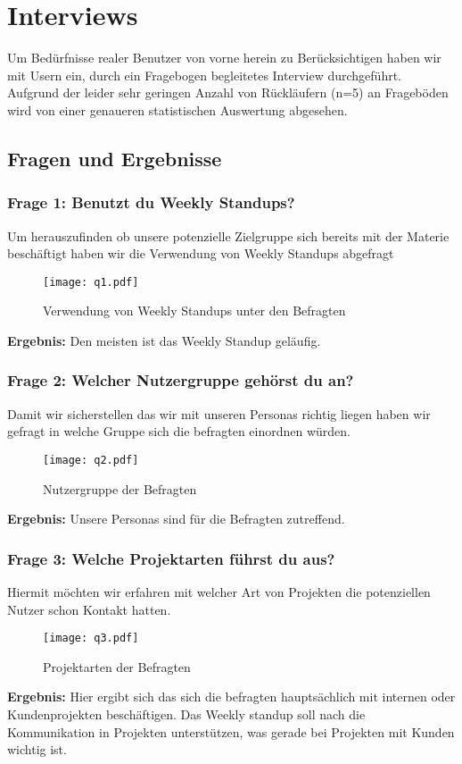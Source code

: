 \chapter{Interviews}

Um Bedürfnisse realer Benutzer von vorne herein zu Berücksichtigen haben wir mit Usern ein, durch ein Fragebogen begleitetes Interview durchgeführt. Aufgrund der leider sehr geringen Anzahl von Rückläufern (n=5) an Frageböden wird von einer genaueren statistischen Auswertung abgesehen.

\section{Fragen und Ergebnisse}

\subsection{Frage 1: Benutzt du Weekly Standups?}
Um herauszufinden ob unsere potenzielle Zielgruppe sich bereits mit der Materie beschäftigt haben wir die Verwendung von Weekly Standups abgefragt
\begin{figure}[H]
	\centering
	\texttt{[image: q1.pdf]}
    \caption{Verwendung von Weekly Standups unter den Befragten}
	\label{fig:q1}
\end{figure}
\textbf{Ergebnis:} Den meisten ist das Weekly Standup geläufig.
\subsection{Frage 2: Welcher Nutzergruppe gehörst du an?}
Damit wir sicherstellen das wir mit unseren Personas richtig liegen haben wir gefragt in welche Gruppe sich die befragten einordnen würden.
\begin{figure}[H]
	\centering
	\texttt{[image: q2.pdf]}
    \caption{Nutzergruppe der Befragten}
	\label{fig:q2}
\end{figure}
\textbf{Ergebnis:} Unsere Personas sind für die Befragten zutreffend.
\subsection{Frage 3: Welche Projektarten führst du aus?}
Hiermit möchten wir erfahren mit welcher Art von Projekten die potenziellen Nutzer schon Kontakt hatten. 
\begin{figure}[H]
	\centering
	\texttt{[image: q3.pdf]}
    \caption{Projektarten der Befragten}
	\label{fig:q3}
\end{figure}
\textbf{Ergebnis:} Hier ergibt sich das sich die befragten hauptsächlich mit internen oder Kundenprojekten beschäftigen. Das Weekly standup soll nach die Kommunikation in Projekten unterstützen, was gerade bei Projekten mit Kunden wichtig ist.
